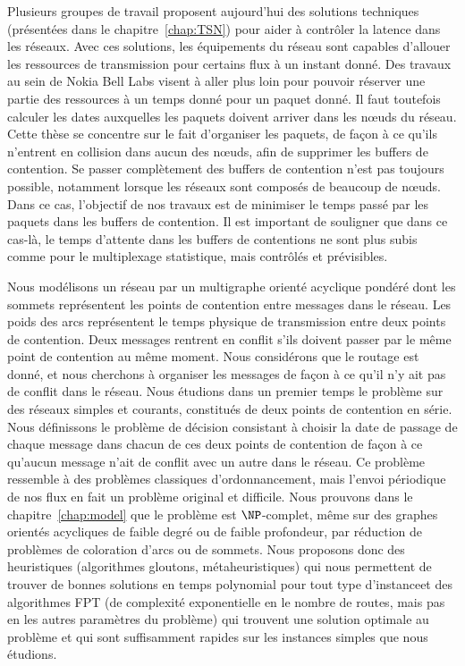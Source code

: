 Plusieurs groupes de travail proposent aujourd'hui des solutions techniques (présentées dans le chapitre~\ref{chap:TSN}) pour aider à contrôler la latence dans les réseaux. Avec ces solutions, les équipements du réseau sont capables d'allouer les ressources de transmission pour certains flux à un instant donné. Des travaux au sein de Nokia Bell Labs visent à aller plus loin pour pouvoir réserver une partie des ressources à un temps donné pour un paquet donné. Il faut toutefois calculer les dates auxquelles les paquets doivent arriver dans les nœuds du réseau. Cette thèse se concentre sur le fait d'organiser les paquets, de façon à ce qu'ils n'entrent en collision dans aucun des nœuds, afin de supprimer les buffers de contention. Se passer complètement des buffers de contention n'est pas toujours possible, notamment lorsque les réseaux sont composés de beaucoup de nœuds. Dans ce cas, l'objectif de nos travaux est de minimiser le temps passé par les paquets dans les buffers de contention. Il est important de souligner que dans ce cas-là, le temps d'attente dans les buffers de contentions ne sont plus subis comme pour le multiplexage statistique, mais contrôlés et prévisibles.

Nous modélisons un réseau par un multigraphe orienté acyclique pondéré dont les sommets représentent les points de contention entre messages dans le réseau. Les poids des arcs représentent le temps physique de transmission entre deux points de contention. Deux messages rentrent en conflit s’ils doivent passer par le même point de contention au même moment. Nous considérons que le routage est donné, et nous cherchons à organiser les messages de façon à ce qu'il n'y ait pas de conflit dans le réseau. Nous étudions dans un premier temps le problème sur des réseaux simples et courants, constitués de deux points de contention en série. 
Nous définissons le problème de décision consistant à choisir la date de passage de chaque message dans chacun de ces deux points de contention de façon à ce qu'aucun message n'ait de conflit avec un autre dans le réseau. Ce problème ressemble à des problèmes classiques d'ordonnancement, mais l'envoi périodique de nos flux en fait un problème original et difficile. Nous prouvons dans le chapitre~\ref{chap:model} que le problème est $\NP$-complet, même sur des graphes orientés acycliques de faible degré ou de faible profondeur, par réduction de problèmes de coloration d'arcs ou de sommets. Nous proposons donc des heuristiques (algorithmes gloutons, métaheuristiques) qui nous permettent de trouver de bonnes solutions en temps polynomial pour tout type d'instanceet des algorithmes FPT (de complexité exponentielle en le nombre de routes, mais pas en les autres paramètres du problème) qui trouvent une solution optimale au problème et qui sont suffisamment rapides sur les instances simples que nous étudions.


